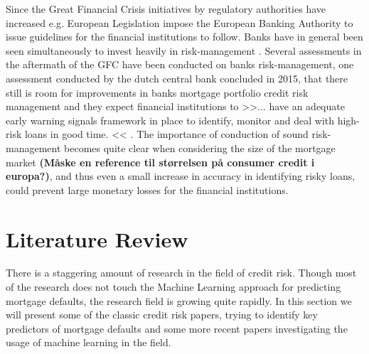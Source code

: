 Since the Great Financial Crisis initiatives by regulatory authorities have increased e.g. European Legislation \cite{CRR} impose the European Banking Authority to issue guidelines for the financial institutions to follow. Banks have in general been seen simultaneously to invest heavily in risk-management \cite{risk_management_five_years_on_ey}. Several assessments in the aftermath of the GFC have been conducted on banks risk-management, one assessment conducted by the dutch central bank concluded in 2015, that there still is room for improvements in banks mortgage portfolio credit risk management and they expect financial institutions to >>... have an adequate early warning signals framework in place to identify, monitor and deal with high-risk loans in good time. << \cite{DNB_2015}. The importance of conduction of sound risk-management becomes quite clear when considering the size of the mortgage market \textbf{(Måske en reference til størrelsen på consumer credit i europa?)}, and thus even a small increase in accuracy in identifying risky loans, could prevent large monetary losses for the financial institutions. 

\section{Literature Review}
There is a staggering amount of research in the field of credit risk. Though most of the research does not touch the Machine Learning approach for predicting mortgage defaults, the research field is growing quite rapidly. In this section we will present some of the classic credit risk papers, trying to identify key predictors of mortgage defaults and some more recent papers investigating the usage of machine learning in the field.





















